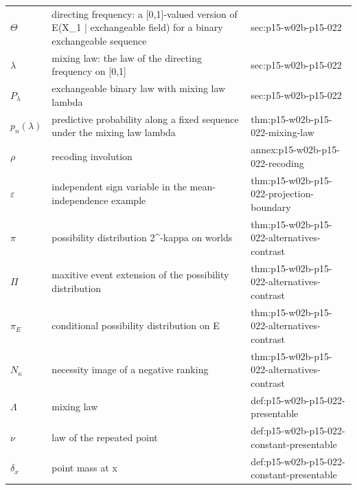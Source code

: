 \begin{longtable}{@{}p{}p{}p{}@{}}
\(\Theta\) & directing frequency: a [0,1]-valued version of E(X\_1 | exchangeable field) for a binary exchangeable sequence & sec:\allowbreak{}p15-\allowbreak{}w02b-\allowbreak{}p15-\allowbreak{}022 \\
\(\lambda\) & mixing law: the law of the directing frequency on [0,1] & sec:\allowbreak{}p15-\allowbreak{}w02b-\allowbreak{}p15-\allowbreak{}022 \\
\(P_\lambda\) & exchangeable binary law with mixing law lambda & sec:\allowbreak{}p15-\allowbreak{}w02b-\allowbreak{}p15-\allowbreak{}022 \\
\(p_n(\lambda)\) & predictive probability along a fixed sequence under the mixing law lambda & thm:\allowbreak{}p15-\allowbreak{}w02b-\allowbreak{}p15-\allowbreak{}022-\allowbreak{}mixing-\allowbreak{}law \\
\(\rho\) & recoding involution & annex:\allowbreak{}p15-\allowbreak{}w02b-\allowbreak{}p15-\allowbreak{}022-\allowbreak{}recoding \\
\(\varepsilon\) & independent sign variable in the mean-independence example & thm:\allowbreak{}p15-\allowbreak{}w02b-\allowbreak{}p15-\allowbreak{}022-\allowbreak{}projection-\allowbreak{}boundary \\
\(\pi\) & possibility distribution 2\^{}{-kappa} on worlds & thm:\allowbreak{}p15-\allowbreak{}w02b-\allowbreak{}p15-\allowbreak{}022-\allowbreak{}alternatives-\allowbreak{}contrast \\
\(\Pi\) & maxitive event extension of the possibility distribution & thm:\allowbreak{}p15-\allowbreak{}w02b-\allowbreak{}p15-\allowbreak{}022-\allowbreak{}alternatives-\allowbreak{}contrast \\
\(\pi_E\) & conditional possibility distribution on E & thm:\allowbreak{}p15-\allowbreak{}w02b-\allowbreak{}p15-\allowbreak{}022-\allowbreak{}alternatives-\allowbreak{}contrast \\
\(N_\kappa\) & necessity image of a negative ranking & thm:\allowbreak{}p15-\allowbreak{}w02b-\allowbreak{}p15-\allowbreak{}022-\allowbreak{}alternatives-\allowbreak{}contrast \\
\(\Lambda\) & mixing law & def:\allowbreak{}p15-\allowbreak{}w02b-\allowbreak{}p15-\allowbreak{}022-\allowbreak{}presentable \\
\(\nu\) & law of the repeated point & def:\allowbreak{}p15-\allowbreak{}w02b-\allowbreak{}p15-\allowbreak{}022-\allowbreak{}constant-\allowbreak{}presentable \\
\(\delta_x\) & point mass at x & def:\allowbreak{}p15-\allowbreak{}w02b-\allowbreak{}p15-\allowbreak{}022-\allowbreak{}constant-\allowbreak{}presentable \\

\end{longtable}
